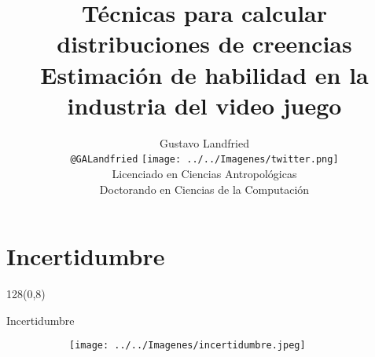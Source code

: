 \documentclass[shownotes]{beamer}
\title[Distribuciones de creencias]{Técnicas para calcular distribuciones de creencias \\
\large Estimaci\'on de habilidad en la industria del video juego}
\author[Gustavo Landfried]{Gustavo Landfried \\ \scriptsize \texttt{@GALandfried} \texttt{[image: ../../Imagenes/twitter.png]} \\\vspace{.75cm}
Licenciado en Ciencias Antropológicas \\
Doctorando en Ciencias de la Computación}
\institute[DC-ICC-CONICET]{\vspace{1.25cm} \texttt{[image: ../../Imagenes/dc-logo]}}
\date{}
\begin{document}
\small

\begin{frame}[noframenumbering]
 
% 
 \vspace{.5cm}
\maketitle
 
\end{frame}


\section{Incertidumbre}
\begin{frame}
\begin{textblock}{128}(0,8)
\begin{center}
 \Large Incertidumbre
\end{center}
\end{textblock}

\vspace{0.75cm}

\begin{figure}[H]     
     \centering \normalsize
     \begin{subfigure}[b]{0.75\textwidth}
       \texttt{[image: ../../Imagenes/incertidumbre.jpeg]} 
     \end{subfigure}
\end{figure}

\end{frame}
\end{document}
